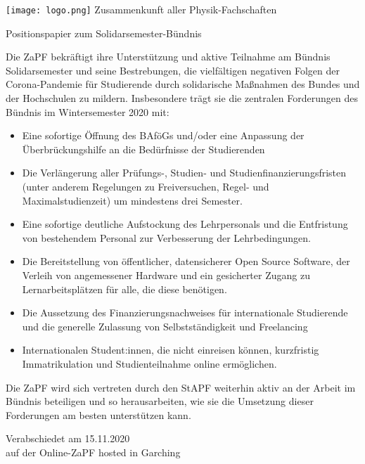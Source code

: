 \documentclass[a4paper]{scrartcl}
\begin{document}
    \hspace{0.87\textwidth}
    \begin{minipage}{120pt}
        \vspace{-1.8cm}
        \texttt{[image: logo.png]}
        \centering
        \small Zusammenkunft aller Physik-Fachschaften
    \end{minipage}
    \begin{center}
        \huge{Positionspapier zum Solidarsemester-Bündnis}\vspace{.25\baselineskip}\\
        \normalsize
    \end{center}
    \vspace{1cm}

Die ZaPF bekräftigt ihre Unterstützung und aktive Teilnahme am Bündnis Solidarsemester und seine Bestrebungen, die vielfältigen negativen Folgen der Corona-Pandemie für Studierende durch solidarische Maßnahmen des Bundes und der Hochschulen zu mildern. Insbesondere trägt sie die zentralen Forderungen des Bündnis im Wintersemester 2020 mit:
\begin{itemize}
\item Eine sofortige Öffnung des BAföGs und/oder eine Anpassung der Überbrückungshilfe an die Bedürfnisse der Studierenden
\item Die Verlängerung aller Prüfungs-, Studien- und Studienfinanzierungsfristen (unter anderem Regelungen zu Freiversuchen, Regel- und Maximalstudienzeit) um mindestens drei Semester.
\item Eine sofortige deutliche Aufstockung des Lehrpersonals und die Entfristung von bestehendem Personal zur Verbesserung der Lehrbedingungen.
\item Die Bereitstellung von öffentlicher, datensicherer Open Source Software, der Verleih von angemessener Hardware und ein gesicherter Zugang zu Lernarbeitsplätzen für alle, die diese benötigen.
\item Die Aussetzung des Finanzierungsnachweises für internationale Studierende und die generelle Zulassung von Selbstständigkeit und Freelancing
\item Internationalen Student:innen, die nicht einreisen können, kurzfristig Immatrikulation und Studienteilnahme online ermöglichen.
\end{itemize}
Die ZaPF wird sich vertreten durch den StAPF weiterhin aktiv an der Arbeit im Bündnis beteiligen und so herausarbeiten, wie sie die Umsetzung dieser Forderungen am besten unterstützen kann.

\vspace*{\fill}
\begin{flushright}
Verabschiedet am 15.11.2020\\
auf der Online-ZaPF hosted in Garching
\end{flushright}
\end{document}
